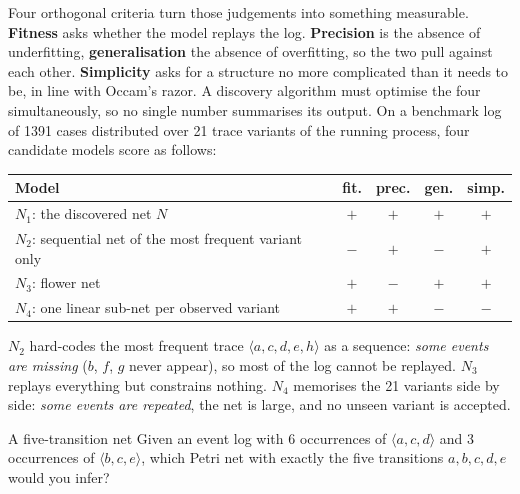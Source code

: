 Four orthogonal criteria turn those judgements into something measurable. \textbf{Fitness} asks whether the model replays the log. \textbf{Precision} is the absence of underfitting, \textbf{generalisation} the absence of overfitting, so the two pull against each other. \textbf{Simplicity} asks for a structure no more complicated than it needs to be, in line with Occam's razor. A discovery algorithm must optimise the four simultaneously, so no single number summarises its output. On a benchmark log of 1391 cases distributed over 21 trace variants of the running process, four candidate models score as follows:
\begin{center}
\small
\begin{tabular}{lcccc}
\toprule
\textbf{Model} & \textbf{fit.} & \textbf{prec.} & \textbf{gen.} & \textbf{simp.} \\
\midrule
$N_1$: the discovered net $N$ & $+$ & $+$ & $+$ & $+$ \\
$N_2$: sequential net of the most frequent variant only & $-$ & $+$ & $-$ & $+$ \\
$N_3$: flower net & $+$ & $-$ & $+$ & $+$ \\
$N_4$: one linear sub-net per observed variant & $+$ & $+$ & $-$ & $-$ \\
\bottomrule
\end{tabular}
\end{center}
$N_2$ hard-codes the most frequent trace $\langle a, c, d, e, h\rangle$ as a sequence: \emph{some events are missing} ($b$, $f$, $g$ never appear), so most of the log cannot be replayed. $N_3$ replays everything but constrains nothing. $N_4$ memorises the 21 variants side by side: \emph{some events are repeated}, the net is large, and no unseen variant is accepted.

\begin{examplebox}{A five-transition net}
Given an event log with 6 occurrences of $\langle a, c, d\rangle$ and 3 occurrences of $\langle b, c, e\rangle$, which Petri net with exactly the five transitions $a, b, c, d, e$ would you infer?
\end{examplebox}

